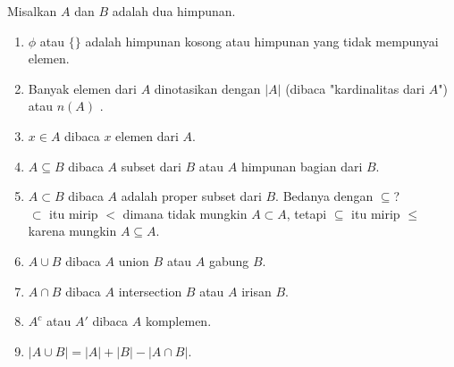 \documentclass[11pt]{scrartcl}
\begin{document}
	Misalkan $A$ dan $B$ adalah dua himpunan.
	\begin{enumerate}
	    \item $\phi$ atau $\{\}$ adalah himpunan kosong atau himpunan yang tidak mempunyai elemen.
	    \item Banyak elemen dari $A$ dinotasikan dengan $|A|$ (dibaca "kardinalitas dari $A$") atau $n(A)$ .
	    \item $x \in A$ dibaca $x$ elemen dari $A$.
	    \item $A \subseteq B$ dibaca $A$ subset dari $B$ atau $A$ himpunan bagian dari $B$.
	    \item $A \subset B$ dibaca $A$ adalah proper subset dari $B$. Bedanya dengan $\subseteq$?\\
	    $\subset$ itu mirip $<$ dimana tidak mungkin $A \subset A$, tetapi $\subseteq$ itu mirip $\le$ karena mungkin $A \subseteq A$.
	    \item $A \cup B$ dibaca $A$ union $B$ atau $A$ gabung $B$.
	    \item $A \cap B$ dibaca $A$ intersection $B$ atau $A$ irisan $B$.
	    \item $A^c$ atau $A'$ dibaca $A$ komplemen.
	    \item $|A \cup B| = |A|+|B|-|A \cap B|$.
	\end{enumerate}
	
\end{document}
